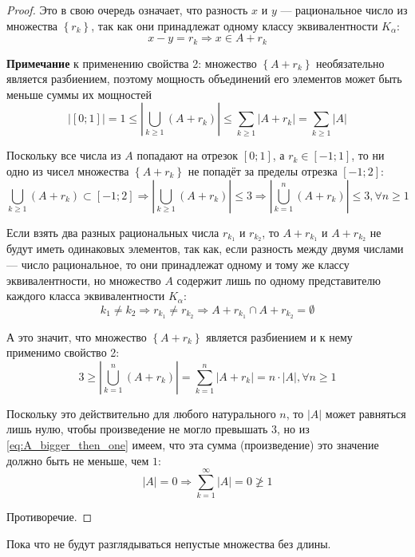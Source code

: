 \begin{proof}
    Это в свою очередь означает, что разность $x$ и $y$ --- рациональное число
    из множества $\left\{r_k\right\}$, так как они принадлежат
    одному классу эквивалентности $K_{\alpha}$:
           $$x-y=r_k\Rightarrow x\in A+r_k$$

    \textbf{Примечание} к применению свойства 2:
    множество $\left\{A+r_k\right\}$ необязательно является разбиением,
    поэтому мощность объединений его элементов
    может быть меньше суммы их мощностей
    \begin{equation}\label{eq:A_bigger_then_one}
        \left|\left[0;1\right]\right|=1
        \le\left|\bigcup_{k\ge 1} \left(A+r_k\right)\right|
        \le\sum_{k\ge 1} \left|A+r_k\right|
        =\sum_{k\ge 1} \left|A\right|
    \end{equation}
    
    Поскольку все числа из $A$ попадают на отрезок $\left[0;1\right]$,
    а $r_k\in\left[ -1;1\right]$,
    то ни одно из чисел множества $\left\{A+r_k\right\}$ не попадёт за пределы
    отрезка $\left[-1;2\right]$:
    $$\bigcup_{k\ge 1} \left(A+r_k\right)\subset\left[-1;2\right]
    \Rightarrow \left|\bigcup_{k\ge 1} \left(A+r_k\right)\right|\le 3
    \Rightarrow \left|\bigcup_{k=1}^n \left(A+r_k\right)\right|\le 3,
    \forall n\ge1$$
    
    Если взять два разных рациональных числа $r_{k_1}$ и $r_{k_2}$,
    то $A+r_{k_1}$ и $A+r_{k_2}$ не будут иметь одинаковых элементов,
    так как, если разность между двумя числами --- число рациональное,
    то они принадлежат одному и тому же классу эквивалентности,
    но множество $A$ содержит лишь по одному представителю
    каждого класса эквивалентности $K_{\alpha}$:
    $$k_1\neq k_2\Rightarrow
    r_{k_1}\neq r_{k_2}\Rightarrow
    A+r_{k_1} \cap A+r_{k_2} = \emptyset$$

    А это значит, что множество $\left\{A+r_k\right\}$ является разбиением
    и к нему применимо свойство 2:
    $$
    3\ge\left|\bigcup_{k=1}^n \left(A+r_k\right)\right|
    =\sum_{k=1}^n \left|A+r_k\right|
    =n\cdot\left|A\right|, \forall n\ge 1$$

    Поскольку это действительно для любого натурального $n$, то
    $\left|A\right|$ может равняться лишь нулю,
    чтобы произведение не могло превышать $3$,
    но из \eqref{eq:A_bigger_then_one} имеем,
    что эта сумма (произведение) это значение должно быть не меньше, чем $1$:
    $$\left|A\right|=0
    \Rightarrow \sum_{k=1}^\infty \left|A\right|=0\not\ge 1$$

    Противоречие.
\end{proof}
Пока что не будут разглядываться непустые множества без длины.
